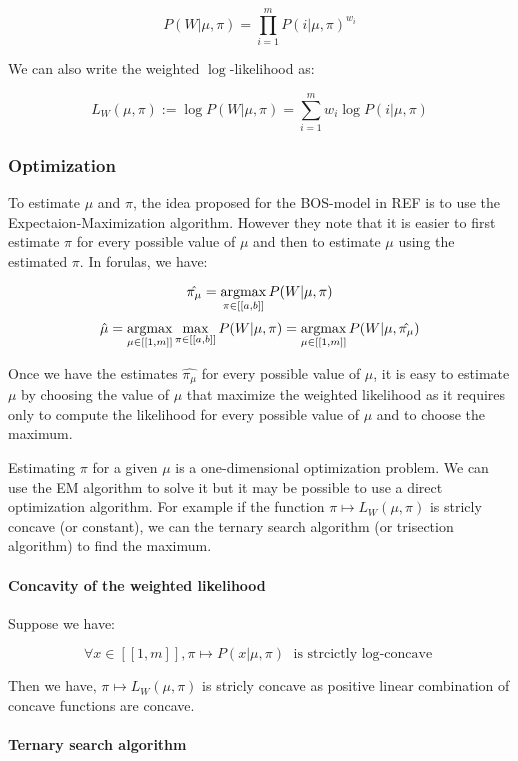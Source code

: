 $$P(W | \mu, \pi) = \prod_{i=1}^m P(i | \mu, \pi)^{w_i}$$

We can also write the weighted $\log$-likelihood as:

$$L_W(\mu, \pi) := \log P(W | \mu, \pi) = \sum_{i=1}^m w_i \log P(i | \mu, \pi)$$


\subsubsection{Optimization}
\label{sec:univariate_generic_estimation}

To estimate $\mu$ and $\pi$, the idea proposed for the BOS-model in REF is to use the Expectaion-Maximization algorithm. However they note that it is easier to first estimate $\pi$ for every possible value of $\mu$ and then to estimate $\mu$ using the estimated $\pi$. In forulas, we have:


$$\hat{\pi_{\mu}} = \operatorname*{argmax}_{\pi \in [[a, b]]} P(W | \mu, \pi)$$
$$\hat{\mu} = \operatorname*{argmax}_{\mu \in [[1, m]]} \max_{\pi \in [[a, b]]} P(W | \mu, \pi) = \operatorname*{argmax}_{\mu \in [[1, m]]} P(W | \mu, \hat{\pi_{\mu}})$$

Once we have the estimates $\hat{\pi_{\mu}}$ for every possible value of $\mu$, it is easy to estimate $\mu$ by choosing the value of $\mu$ that maximize the weighted likelihood as it requires only to compute the likelihood for every possible value of $\mu$ and to choose the maximum.

Estimating $\pi$ for a given $\mu$ is a one-dimensional optimization problem. We can use the EM algorithm to solve it but it may be possible to use a direct optimization algorithm. For example if the function $\pi \mapsto L_W(\mu, \pi)$ is stricly concave (or constant), we can the ternary search algorithm (or trisection algorithm) to find the maximum.

\paragraph{Concavity of the weighted likelihood}

Suppose we have:

$$\forall x \in [[1, m]], \pi \mapsto P(x | \mu, \pi) \text{ is strcictly $\log$-concave}$$

Then we have, $\pi \mapsto L_W(\mu, \pi)$ is stricly concave as positive linear combination of concave functions are concave.

\paragraph{Ternary search algorithm}


